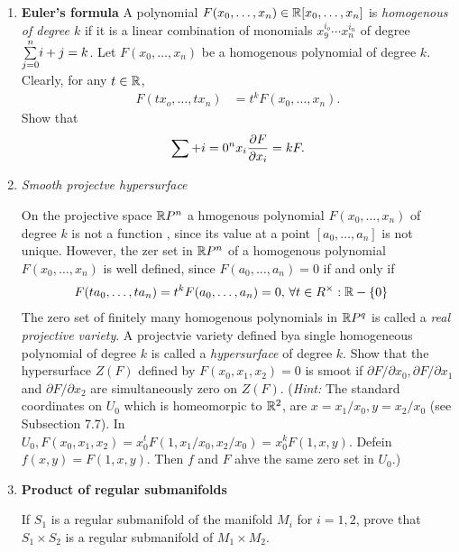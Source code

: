 \documentclass[12pt,a4paper]{report}
\begin{document}
\begin{enumerate}[label=9.\arabic*.]
\item \textbf{Euler's formula}
A polynomial $F(x_0,\dots,x_n) \in \mathbb{R}[x_0,\dots,x_n]$ is \textit{homogenous of degree $k$} if it is a linear combination of monomials $x_9^{i_o}\cdots x_n^{i_n}$ of degree $\underset{j=0}{\overset{n}{\sum}}i+j = k$.  Let $F(x_0,\dots,x_n)$ be a homogenous polynomial of degree $k$.  Clearly, for any $t \in \mathbb{R}$,
\begin{align*}
	F(tx_o,\dots,tx_n) &= t^kF(x_0,\dots, x_n).
\end{align*}Show that
\begin{align*}
	\sum+{i=0}^n x_i\frac{\partial F}{\partial x_i} = kF.
\end{align*}

\item \textit{Smooth projectve hypersurface}

On the projective space $\mathbb{R} P^n$ a hmogenous polynomial $F(x_0,\dots,x_n)$ of degree $k$ is not a function , since its value at a point $[a_0,\dots,a_n]$ is not unique.  However, the zer set in $\mathbb{R} P^n$ of a homogenous polynomial $F(x_0,\dots,x_n)$ is well defined, since $F(a_0,\dots,a_n)=0$ if and only if 
\begin{align*}
	F(ta_0,\dots,ta_n) &= t^kF(a_0,\dots,a_n)=0,\, \forall t \in R^\times: \mathbb{R}-\{0\}
\end{align*}The zero set of finitely many homogenous polynomials in $\mathbb{R} P^q$ is called a \textit{real projective variety}.  A projectvie variety defined bya single homogeneous polynomial of degree $k$ is called a \textit{hypersurface} of degree $k$.  Show that the hypersurface $Z(F)$ defined by $F(x_0,x_1,x_2)=0$ is smoot if $\partial F/\partial x_0, \partial F/\partial x_1$ and $\partial F/\partial x_2$ are simultaneously zero on $Z(F)$.  (\textit{Hint:} The standard coordinates on $U_0$ which is homeomorpic to $\mathbb{R}^2$, are $x=x_1/x_0, y=x_2/x_0$ (see Subsection 7.7).  In $U_0, F(x_0,x_1,x_2) = x_0^tF(1,x_1/x_0, x_2/x_0)= x_0^kF(1,x,y)$.  Defein $f(x,y)= F(1,x,y)$.  Then $f$ and $F$ ahve the same zero set in $U_0$.)

\item \textbf{Product of regular submanifolds}

If $S_1$ is a regular submanifold of the manifold $M_i$ for $i=1,2$, prove that $S_1 \times S_2$ is a regular submanifold of $M_1 \times M_2$.

\end{enumerate}
\end{document}
